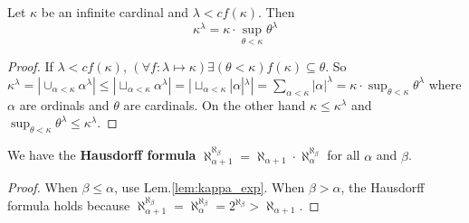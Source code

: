 \documentclass[12pt]{book}
\begin{document}
\begin{lemma}
	Let $\kappa$ be an infinite cardinal and $\lambda<cf(\kappa)$. Then
	\begin{equation}
		\kappa^\lambda=\kappa\cdot\sup_{\theta<\kappa}\theta^\lambda
	\end{equation}
	\label{lem:kappa_exp}
\end{lemma}
\begin{proof}
	If $\lambda<cf(\kappa)$, $(\forall f:\lambda\mapsto\kappa)\exists(\theta<\kappa)f(\kappa)\subseteq \theta$. So $\kappa^\lambda=|\cup_{\alpha<\kappa}\alpha^\lambda|\leq |\sqcup_{\alpha<\kappa}\alpha^\lambda|=|\sqcup_{\alpha<\kappa}|\alpha|^\lambda|=\sum_{\alpha<\kappa}|\alpha|^\lambda=\kappa\cdot\sup_{\theta<\kappa}\theta^\lambda$ where $\alpha$ are ordinals and $\theta$ are cardinals. On the other hand $\kappa\leq\kappa^\lambda$ and $\sup_{\theta<\kappa}\theta^\lambda\leq\kappa^\lambda$.
\end{proof}

\begin{corollary}
	We have the {\bf Hausdorff formula} $\aleph_{\alpha+1}^{\aleph_\beta}=\aleph_{\alpha+1}\cdot\aleph_{\alpha}^{\aleph_\beta}$ for all $\alpha$ and $\beta$.
\end{corollary}
\begin{proof}
	
	When $\beta\leq\alpha$, use Lem.\ref{lem:kappa_exp}. When $\beta>\alpha$, the Hausdorff formula holds because $\aleph_{\alpha+1}^{\aleph_\beta}=\aleph_{\alpha}^{\aleph_\beta}=2^{\aleph_\beta}>\aleph_{\alpha+1}$.
\end{proof}
\end{document}
